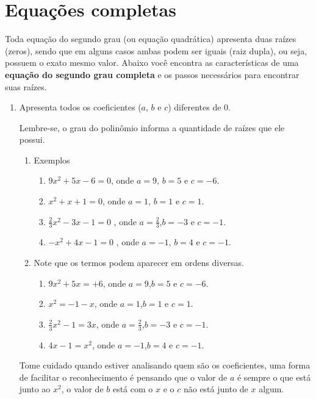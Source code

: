 \documentclass[10pt]{article}
\begin{document}
\section*{Equações completas}
Toda equação do segundo grau (ou equação quadrática) apresenta duas raízes (zeros), sendo que em alguns casos ambas podem ser iguais (raiz dupla), ou seja, possuem o exato mesmo valor. Abaixo você encontra as características de uma \textbf{equação do segundo grau completa} e os passos necessários para encontrar suas raízes.
\begin{enumerate}[label=\textbf{(\roman*)}]
    \item Apresenta todos os coeficientes (\( a \), \( b \)  e  \( c \)) diferentes de \( 0 \).
    
        Lembre-se, o grau do polinômio informa a quantidade de raízes que ele possui.
    \begin{enumerate}
        \item Exemplos
        \begin{enumerate}
            \item \( 9x^2 + 5x -6 = 0 \), onde \( a = 9\), \( b = 5\) e  \( c = -6\).
            \item \( x^2 + x +1 = 0 \), onde \( a = 1\), \( b = 1\) e  \( c = 1\).
            \item \( \frac{2}{3}x^2 - 3x -1 = 0 \) , onde \( a = \frac{2}{3}\),\( b = -3\) e  \( c = -1\).
            \item \( -x^2 + 4x -1 = 0 \) , onde \( a = -1\), \( b = 4\) e  \( c = -1\).
        \end{enumerate}
         \item Note que os termos podem aparecer em ordens diversas.
        \begin{enumerate}
            \item \( 9x^2 + 5x = +6 \), onde \( a = 9\),\( b = 5\) e  \( c = -6\).
            \item \( x^2= -1 -x \), onde \( a = 1\),\( b = 1\) e  \( c = 1\).
            \item \( \frac{2}{3}x^2-1 = 3x\), onde \( a = \frac{2}{3}\),\( b = -3\) e  \( c = -1\).
            \item \( 4x -1 = x^2 \), onde \( a = -1\),\( b = 4\) e  \( c = -1\).
        \end{enumerate}
    
    \end{enumerate}
    \begin{obs}
        Tome cuidado quando estiver analisando quem são os coeficientes, uma forma de facilitar o reconhecimento é pensando que o valor de \( a \) é sempre o que está junto ao \( x^2 \), o valor de \( b \) está com o \( x \) e o \( c \) não está junto de \( x \) algum.
    \end{obs}
    

\end{enumerate}
\end{document}
